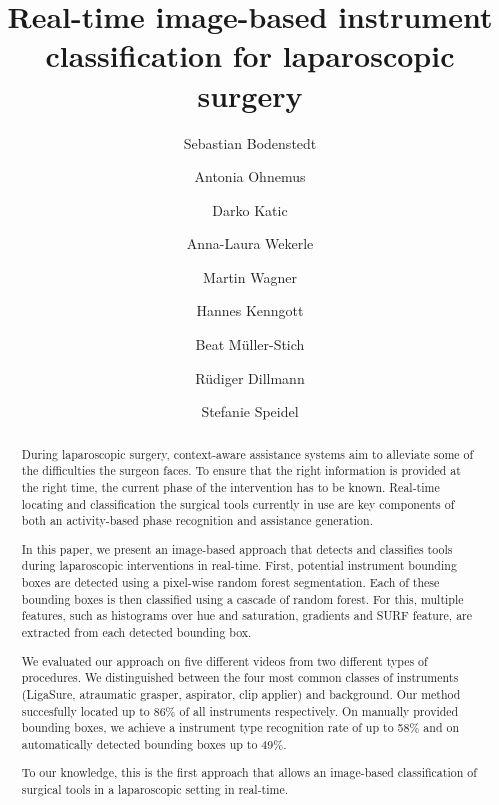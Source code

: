 \documentclass{llncs}
\begin{document}
\title{Real-time image-based instrument classification for laparoscopic surgery}
%

\author{Sebastian Bodenstedt  \and Antonia Ohnemus \and Darko Katic \and
Anna-Laura Wekerle \and Martin Wagner \and Hannes Kenngott \and Beat M{\"u}ller-Stich \and
R{\"u}diger Dillmann \and Stefanie Speidel}
%
%
%
\maketitle              %

\begin{abstract}
During laparoscopic surgery, context-aware assistance systems aim to alleviate some of the difficulties the surgeon faces.
To ensure that the right information is provided at the right time, the current phase of the intervention has to be known.
Real-time locating and classification the surgical tools currently in use are key components of both an activity-based phase recognition and assistance generation.

In this paper, we present an image-based approach that detects and classifies tools during laparoscopic interventions in real-time. 
First, potential instrument bounding boxes are detected using a pixel-wise random forest segmentation.
Each of these bounding boxes is then classified using a cascade of random forest.
For this, multiple features, such as histograms over hue and saturation, gradients and SURF feature, are extracted from each detected bounding box.

We evaluated our approach on five different videos from two different types of procedures.
We distinguished between the four most common classes of instruments (LigaSure, atraumatic grasper, aspirator, clip applier) and background.
Our method succesfully located up to 86\% of all instruments respectively.
On manually provided bounding boxes, we achieve a instrument type recognition rate of up to 58\% and on automatically detected bounding boxes up to 49\%.

To our knowledge, this is the first approach that allows an image-based classification of surgical tools in a laparoscopic setting in real-time.
\end{abstract}
\end{document}
